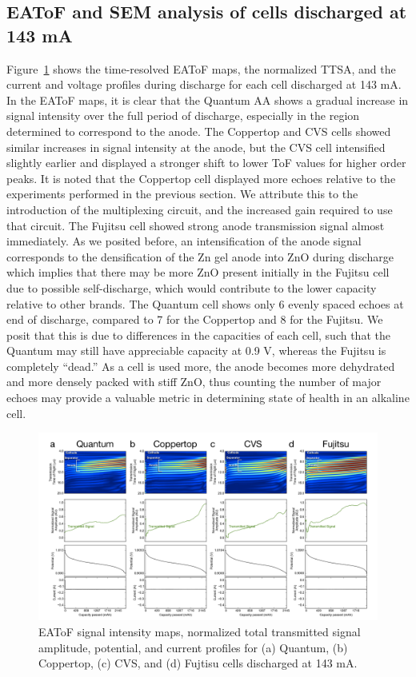 \subsection{EAToF and SEM analysis of cells discharged at 143 mA}

Figure~\ref{fig:brand143} shows the time-resolved EAToF maps, the normalized TTSA, and the current and voltage profiles during discharge for each cell discharged at 143 mA. In the EAToF maps, it is clear that the Quantum AA shows a gradual increase in signal intensity over the full period of discharge, especially in the region determined to correspond to the anode. The Coppertop and CVS cells showed similar increases in signal intensity at the anode, but the CVS cell intensified slightly earlier and displayed a stronger shift to lower ToF values for higher order peaks. It is noted that the Coppertop cell displayed more echoes relative to the experiments performed in the previous section. We attribute this to the introduction of the multiplexing circuit, and the increased gain required to use that circuit. The Fujitsu cell showed strong anode transmission signal almost immediately. As we posited before, an intensification of the anode signal corresponds to the densification of the Zn gel anode into ZnO during discharge which implies that there may be more ZnO present initially in the Fujitsu cell due to possible self-discharge, which would contribute to the lower capacity relative to other brands. The Quantum cell shows only 6 evenly spaced echoes at end of discharge, compared to 7 for the Coppertop and 8 for the Fujitsu. We posit that this is due to differences in the capacities of each cell, such that the Quantum may still have appreciable capacity at 0.9 V, whereas the Fujitsu is completely “dead.” As a cell is used more, the anode becomes more dehydrated and more densely packed with stiff ZnO, thus counting the number of major echoes may provide a valuable metric in determining state of health in an alkaline cell.

\begin{figure}[htb]
  \centering
    \includegraphics[width=\textwidth]{ch5-alkbw/images/BrandCompEAToF_143mA.png}
    \caption[EAToF results for multiple brands of alkaline AA cells discharged at 143 mA.]{EAToF signal intensity maps, normalized total transmitted signal amplitude, potential, and current profiles for (a) Quantum, (b) Coppertop, (c) CVS, and (d) Fujtisu cells discharged at 143 mA.}
    \label{fig:brand143}
\end{figure}

